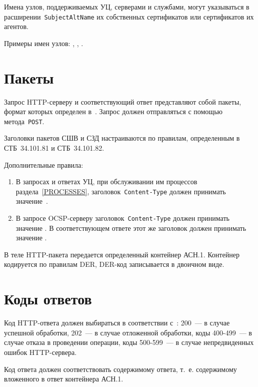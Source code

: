 Имена узлов, поддерживаемых УЦ, серверами и службами, могут указываться в 
расширении~\texttt{SubjectAltName} их собственных сертификатов или 
сертификатов их агентов. 

Примеры имен узлов: , 
, 
.

\section{Пакеты}\label{TRANSPORT.Packets}

Запрос HTTP-серверу и соответствующий ответ представляют собой пакеты,
формат которых определен в~\cite{HTTP}.
%
Запрос должен отправляться с помощью метода~\texttt{POST}.

Заголовки пакетов СШВ и СЗД настраиваются по правилам, 
определенным в СТБ~34.101.81 и СТБ~34.101.82. 

Дополнительные правила:
\begin{enumerate}
\item
В запросах и ответах УЦ, при обслуживании им процессов раздела~\ref{PROCESSES},
заголовок~\texttt{Content-Type} должен принимать значение~.

\item
В запросе OCSP-серверу заголовок~\texttt{Content-Type} 
должен принимать значение .
В соответствующем ответе этот же заголовок должен принимать значение 
. 
\end{enumerate}

В теле HTTP-пакета передается определенный контейнер АСН.1.
Контейнер кодируется по правилам DER, DER-код записывается
в двоичном виде.

\section{Коды ответов}\label{TRANSPORT.Codes}

Код HTTP-ответа должен выбираться в соответствии с~\cite{HTTP}: 
200~--- в случае успешной обработки, 
202~--- в случае отложенной обработки,
коды 400-499~--- в случае отказа в проведении операции,
коды 500-599~--- в случае непредвиденных ошибок HTTP-сервера.

Код ответа должен соответствовать содержимому ответа, т.~е.
содержимому вложенного в ответ контейнера АСН.1.

\section{}\label{TRANSPORT.Nonce}

